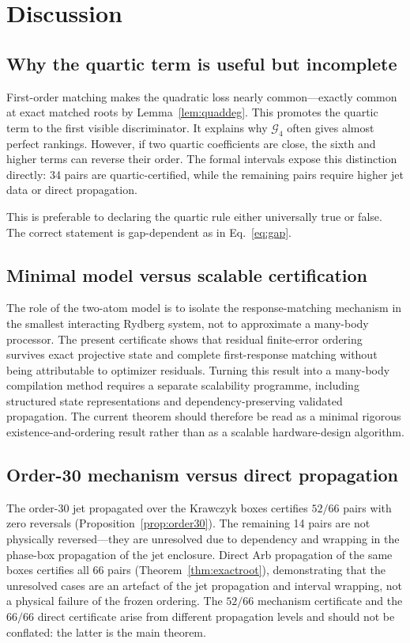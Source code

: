 \documentclass[11pt]{article}
\newcommand{\cG}{\mathcal{G}}
\begin{document}
\section{Discussion}

\subsection{Why the quartic term is useful but incomplete}

First-order matching makes the quadratic loss nearly common---exactly common at exact matched roots by Lemma~\ref{lem:quaddeg}. This promotes the quartic term to the first visible discriminator. It explains why $\cG_4$ often gives almost perfect rankings. However, if two quartic coefficients are close, the sixth and higher terms can reverse their order. The formal intervals expose this distinction directly: 34 pairs are quartic-certified, while the remaining pairs require higher jet data or direct propagation.

This is preferable to declaring the quartic rule either universally true or false. The correct statement is gap-dependent as in Eq.~\eqref{eq:gap}.

\subsection{Minimal model versus scalable certification}

The role of the two-atom model is to isolate the response-matching mechanism
in the smallest interacting Rydberg system, not to approximate a many-body
processor. The present certificate shows that residual finite-error ordering
survives exact projective state and complete first-response matching without
being attributable to optimizer residuals. Turning this result into a
many-body compilation method requires a separate scalability programme,
including structured state representations and dependency-preserving
validated propagation. The current theorem should therefore be read as a
minimal rigorous existence-and-ordering result rather than as a scalable
hardware-design algorithm.

\subsection{Order-30 mechanism versus direct propagation}

The order-30 jet propagated over the Krawczyk boxes certifies $52/66$ pairs with zero reversals (Proposition~\ref{prop:order30}). The remaining 14 pairs are not physically reversed---they are unresolved due to dependency and wrapping in the phase-box propagation of the jet enclosure. Direct Arb propagation of the same boxes certifies all 66 pairs (Theorem~\ref{thm:exactroot}), demonstrating that the unresolved cases are an artefact of the jet propagation and interval wrapping, not a physical failure of the frozen ordering. The $52/66$ mechanism certificate and the $66/66$ direct certificate arise from different propagation levels and should not be conflated: the latter is the main theorem.
\end{document}
